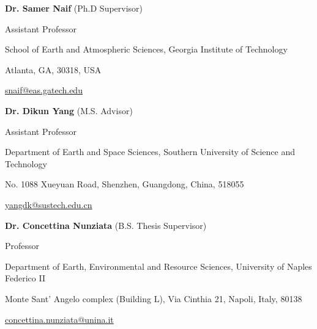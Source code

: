 

\begin{cvparagraph}

    \fontsize{11pt}{1.3em}\selectfont
    \textbf{Dr. Samer Naif} (Ph.D Supervisor)

    Assistant Professor

    School of Earth and Atmospheric Sciences, Georgia Institute of Technology

    Atlanta, GA, 30318, USA

    \href{mailto:snaif@eas.gatech.edu}
    {\underline{snaif@eas.gatech.edu}}

    \vspace{12pt}

    \textbf{Dr. Dikun Yang} (M.S. Advisor)

    Assistant Professor

    Department of Earth and Space Sciences, Southern University of Science and Technology
    
    No. 1088 Xueyuan Road, Shenzhen, Guangdong, China, 518055


    \href{mailto:yangdk@sustech.edu.cn}
    {\underline{yangdk@sustech.edu.cn}}

    \vspace{12pt}

    \textbf{Dr. Concettina Nunziata} (B.S. Thesis Supervisor)

    Professor

    Department of Earth, Environmental and Resource Sciences, University of Naples Federico II

    Monte Sant' Angelo complex (Building L), Via Cinthia 21, Napoli, Italy, 80138


    \href{mailto:concettina.nunziata@unina.it}
    {\underline{concettina.nunziata@unina.it}}

\end{cvparagraph}
